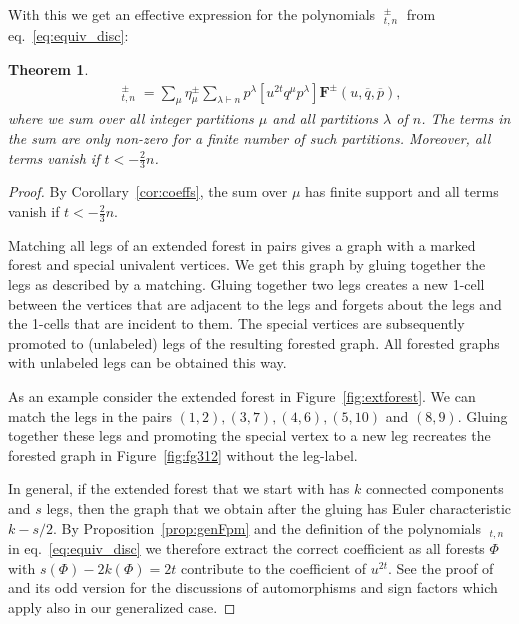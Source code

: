 \documentclass[oneside]{amsart}
\newtheorem{theorem}{Theorem}[section]
\theoremstyle{remark}
\newcommand{\bb}[1]{{\overline{#1}}}
\newcommand{\parts}{\vdash}
\DeclareMathOperator{\ee}{\widehat{e}}
\begin{document}
With this we get an effective expression for the polynomials $\ee_{t,n}^\pm$ from eq.~\eqref{eq:equiv_disc}:
\begin{theorem}
\label{thm:ee}
\begin{align*} \ee_{t,n}^\pm = \sum_\mu \eta^\pm_{\mu} \sum_{\lambda \parts n} p^\lambda [u^{2t} q^\mu p^\lambda] \mathbf F^\pm(u,\bb q, \bb p), \end{align*}
where we sum over all integer partitions $\mu$ and all partitions $\lambda$ of $n$.
The terms in the sum are only non-zero for a finite number of such partitions.
Moreover, all terms vanish if $t < - \frac23 n$.
\end{theorem}
%

\begin{proof}
By Corollary~\ref{cor:coeffs}, the sum over $\mu$ has finite support 
and all terms vanish if $t < - \frac23 n$.

Matching all legs of an extended forest in pairs gives a graph with a marked forest and special univalent vertices. 
We get this graph by gluing together the legs as described by a matching. 
Gluing together two legs creates a new 1-cell between the vertices that are adjacent to the legs and forgets about the legs and the 1-cells that are incident to them. 
The special vertices are subsequently promoted to (unlabeled)
legs of the resulting forested graph.  
All forested graphs with unlabeled legs can be obtained this way.

As an example consider the extended forest in Figure~\ref{fig:extforest}. 
We can match the legs in the pairs $(1,2),(3,7),(4,6),(5,10)$ and $(8,9)$.
Gluing together these legs and promoting the special vertex to a new leg recreates the forested graph in Figure~\ref{fig:fg312} without the leg-label.

In general, if the extended forest that we start with has $k$ connected components and $s$ legs, then 
the graph that we obtain after the gluing has Euler characteristic $k-s/2$.
By Proposition~\ref{prop:genFpm} and the definition of the polynomials $\ee_{t,n}$ in eq.~\eqref{eq:equiv_disc} we therefore extract the correct coefficient as all forests $\Phi$ with $s(\Phi) - 2k(\Phi) = 2t$ contribute to the coefficient of $u^{2t}$.
See the proof of \cite[Proposition~3.10]{BV2} and its odd version \cite[Proposition~5.5]{BV2}
for the discussions of automorphisms and sign factors which apply also in our generalized case.
%
%
%
%
%
\end{proof}

%
%
%
%
%
%
\end{document}
